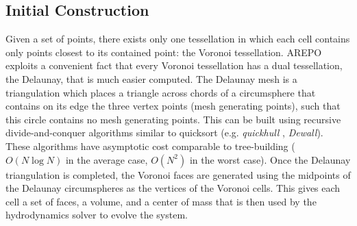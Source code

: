 \documentclass[12pt, preprint]{aastex}
\begin{document}
\subsection{Initial Construction}
Given a set of points, there exists only one tessellation in which each cell
contains only points closest to its contained point: the Voronoi tessellation.
AREPO exploits a convenient fact that every Voronoi tessellation has a dual
tessellation, the Delaunay, that is much easier computed.  The Delaunay mesh is a
triangulation which places a triangle across chords of a circumsphere that contains on
its edge the three vertex points (mesh generating points), such that this
circle contains no mesh generating points.  This can be built using recursive
divide-and-conquer algorithms similar to quicksort (e.g. \textit{quickhull}
\citep{barber1996}, \textit{Dewall}\citep{cignoni1997}). These algorithms have
asymptotic cost comparable to tree-building ($O(N\log N)$ in the average case,
$O(N^2)$ in the worst case).  Once the Delaunay triangulation is completed, the
Voronoi faces are generated using the midpoints of the Delaunay circumspheres as
the vertices of the Voronoi cells.  This gives each cell a set of faces, a
volume, and a center of mass that is then used by the hydrodynamics solver to
evolve the system.
\end{document}
